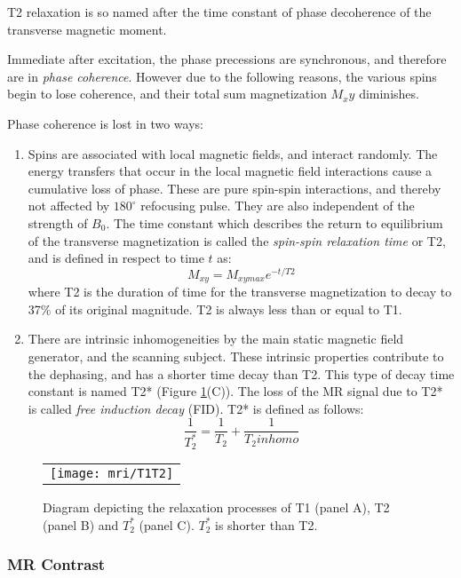 T2 relaxation is so named after the time constant of phase decoherence of the transverse magnetic moment. 

Immediate after excitation, the phase precessions are synchronous, and therefore are in \textit{phase coherence}.  
However due to the following reasons, the various spins begin to lose coherence, and their total sum magnetization $M_xy$ diminishes. 

Phase coherence is lost in two ways:
\begin{enumerate}
\item Spins are associated with local magnetic fields, and interact randomly. The energy transfers that occur in the local magnetic field interactions cause a cumulative loss of phase. These are pure spin-spin interactions, and thereby not affected by $180^\circ$ refocusing pulse. They are also independent of the strength of $B_0$. 
The time constant which describes the return to equilibrium of the transverse magnetization is called the \textit{spin-spin
relaxation time} or T2, and is defined in respect to time $t$ as:
$$M_{xy} =M_{xymax} e^{-t/T2}$$
where T2 is the duration of time for the transverse magnetization to decay to 37$\%$ of its original magnitude. 
T2 is always less than or equal to T1.

\item There are intrinsic inhomogeneities by the main static magnetic field generator, and the scanning subject. These intrinsic properties contribute to the dephasing, and has a shorter time decay than T2. This type of decay time constant is named T2*  (Figure \ref{fig:T1T2}(C)). The loss of the MR signal due to T2* is called\textit{ free induction decay} (FID). T2* is defined as follows: 
$$ \frac{1}{T_2^*} = \frac{1}{T_2} + \frac{1}{T_2inhomo}$$ 
\end{enumerate}

\begin{figure}[ht]
\begin{center}
\begin{tabular}{c}
\texttt{[image: mri/T1T2]}
\end{tabular}
\caption{Diagram depicting the relaxation processes of T1 (panel A), T2 (panel B) and $T_2^*$ (panel C). $T_2^*$ is shorter than T2.} \label{fig:T1T2}
\end{center}
\end{figure}

\subsubsection{MR Contrast}

